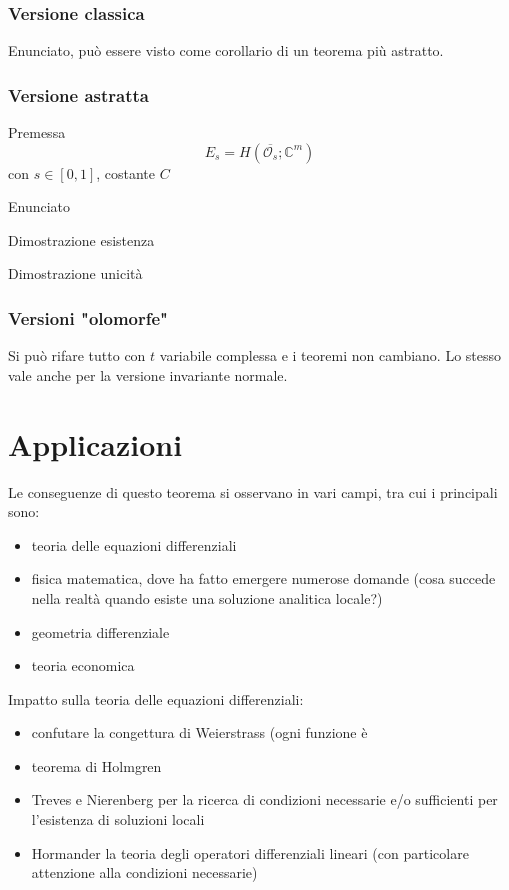 \documentclass{beamer}
\begin{document}
\begin{frame}
\frametitle{Versione classica}
Enunciato, può essere visto come corollario di un teorema più astratto.
\end{frame}

\begin{frame}
\frametitle{Versione astratta}
Premessa $$E_s = H(\overline{\mathcal{O}_s}; \mathbb{C}^m)$$ con $s \in [0,1]$, costante $C$
\end{frame}

\begin{frame}
Enunciato
\end{frame}

\begin{frame}
Dimostrazione esistenza
\end{frame}

\begin{frame}
Dimostrazione unicità
\end{frame}

\begin{frame}
\frametitle{Versioni "olomorfe"}
Si può rifare tutto con $t$ variabile complessa e i teoremi non cambiano. Lo stesso vale anche per la versione invariante normale.
\end{frame}




\section{Applicazioni}

\begin{frame}
Le conseguenze di questo teorema si osservano in vari campi, tra cui i principali sono:
\begin{itemize}
\item teoria delle equazioni differenziali
\item fisica matematica, dove ha fatto emergere numerose domande (cosa succede nella realtà quando esiste una soluzione analitica locale?)
\item geometria differenziale
\item teoria economica
\end{itemize}
\end{frame}

\begin{frame}
Impatto sulla teoria delle equazioni differenziali:
\begin{itemize}
\item confutare la congettura di Weierstrass (ogni funzione è 
\item teorema di Holmgren
\item Treves e Nierenberg per la ricerca di condizioni necessarie e/o sufficienti per l'esistenza di soluzioni locali
\item Hormander la teoria degli operatori differenziali lineari (con particolare attenzione alla condizioni necessarie)
\end{itemize}
\end{frame}
\end{document}
